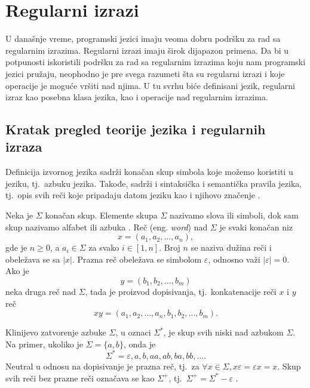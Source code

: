 \documentclass[12pt,oneside]{memoir}
\theoremstyle{plain}
\theoremstyle{definition}
\begin{document}
\chapter{Regularni izrazi}


U današnje vreme, programski jezici imaju veoma dobru podršku za rad sa regularnim izrazima. Regularni izrazi imaju širok dijapazon primena. Da bi u potpunosti iskoristili podršku za rad sa regularnim izrazima koju nam programski jezici pružaju, neophodno je pre svega razumeti šta su regularni izrazi i koje operacije je moguće vršiti nad njima. U tu svrhu biće definisani jezik, regularni izraz kao posebna klasa jezika, kao i operacije nad regularnim izrazima. 

\section{Kratak pregled teorije jezika i regularnih izraza} 

Definicija izvornog jezika sadrži konačan skup simbola koje možemo koristiti u jeziku, tj.~azbuku jezika. Takođe, sadrži i sintaksička i semantička pravila jezika, tj.~opis svih reči koje pripadaju datom jeziku kao i njihovo značenje \cite{Vitas}.

Neka je $\Sigma$ konačan skup. Elemente skupa $\Sigma$ nazivamo slova ili simboli, dok sam skup nazivamo alfabet ili azbuka \cite{Vitas}. Reč (eng. \textit{word}) nad $\Sigma$ je svaki konačan niz $$x = (a_1, a_2, …, a_n),$$ gde je $n \geq 0$, a $a_i \in \Sigma$ za svako $\textit{i} \in [1,n]$. Broj $n$ se naziva dužina reči i obeležava se sa $|x|$. Prazna reč  obeležava se simbolom $\varepsilon$, odnosno važi $| \varepsilon |=0$. Ako je $$y = (b_1, b_2, …, b_m)$$ neka druga reč nad $\Sigma$, tada je proizvod dopisivanja, tj.~konkatenacije reči $x$ i $y$ reč $$xy =(a_1, a_2, …, a_n, b_1, b_2, …, b_m).$$


Klinijevo zatvorenje azbuke $\Sigma$, u oznaci $\Sigma^*$, je skup svih niski nad azbukom $\Sigma$. Na primer, ukoliko je $\Sigma = \{a,b\}$, onda je $$\Sigma^* = { \varepsilon, a, b, aa, ab, ba, bb, …}.$$
Neutral u odnosu na dopisivanje je prazna reč, tj.~za $\forall x\in \Sigma, x\varepsilon = \varepsilon x = x$. Skup svih reči bez prazne reči označava se kao $\Sigma^+$, tj.~$\Sigma^+ = \Sigma^* - { \varepsilon }$ \cite{Vitas}. 
\end{document}
